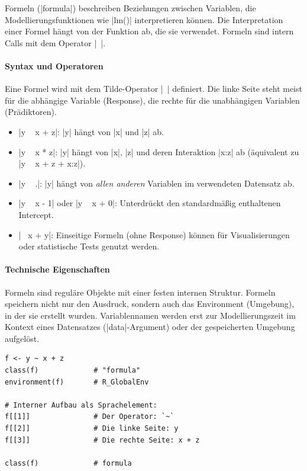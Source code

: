 \documentclass[10pt,twocolumn]{scrartcl}
\renewcommand{\lstinline}{\mycoloredinline}
\begin{document}
Formeln (\lstinline|formula|) beschreiben Beziehungen zwischen Variablen, die Modellierungsfunktionen wie \lstinline|lm()| interpretieren können. Die Interpretation einer Formel hängt von der Funktion ab, die sie verwendet. Formeln sind intern Calls mit dem Operator \lstinline|~|.

\paragraph{Syntax und Operatoren}

Eine Formel wird mit dem Tilde-Operator \lstinline|~| definiert. Die linke Seite steht meist für die abhängige Variable (Response), die rechte für die unabhängigen Variablen (Prädiktoren).

\begin{itemize}
\item \lstinline|y ~ x + z|: \lstinline|y| hängt von \lstinline|x| und \lstinline|z| ab.
\item \lstinline|y ~ x * z|: \lstinline|y| hängt von \lstinline|x|, \lstinline|z| und deren Interaktion \lstinline|x:z| ab (äquivalent zu \lstinline|y ~ x + z + x:z|).
\item \lstinline|y ~ .|: \lstinline|y| hängt von \emph{allen anderen} Variablen im verwendeten Datensatz ab.
\item \lstinline|y ~ x - 1| oder \lstinline|y ~ x + 0|: Unterdrückt den standardmäßig enthaltenen Intercept.
\item \lstinline|~ x + y|: Einseitige Formeln (ohne Response) können für Visualisierungen oder statistische Tests genutzt werden.
\end{itemize}

\paragraph{Technische Eigenschaften}

Formeln sind reguläre Objekte mit einer festen internen Struktur. Formeln speichern nicht nur den Ausdruck, sondern auch das Environment (Umgebung), in der sie erstellt wurden. Variablennamen werden erst zur Modellierungszeit im Kontext eines Datensatzes (\lstinline|data|-Argument) oder der gespeicherten Umgebung aufgelöst.

\begin{lstlisting}
f <- y ~ x + z
class(f)             # "formula"
environment(f)       # R_GlobalEnv

# Interner Aufbau als Sprachelement:
f[[1]]               # Der Operator: `~`
f[[2]]               # Die linke Seite: y
f[[3]]               # Die rechte Seite: x + z

class(f)             # formula
\end{lstlisting}
\end{document}
